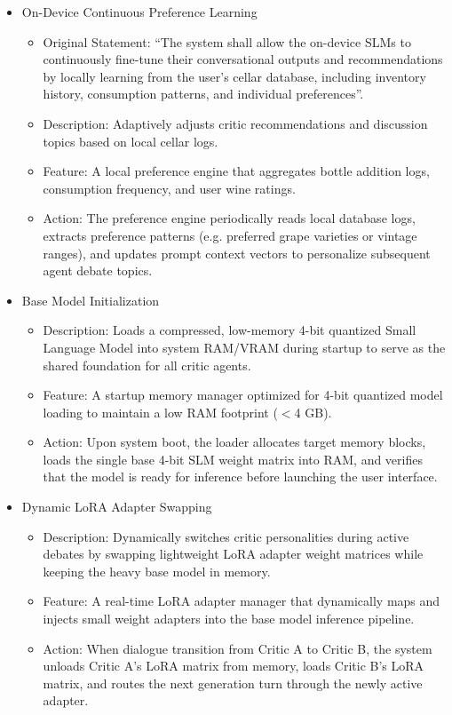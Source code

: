 \documentclass[conference]{IEEEtran}
\begin{document}
\begin{itemize}
    \item On-Device Continuous Preference Learning
    \begin{itemize}
        \item Original Statement: ``The system shall allow the on-device SLMs to continuously fine-tune their conversational outputs and recommendations by locally learning from the user's cellar database, including inventory history, consumption patterns, and individual preferences''.
        \item Description: Adaptively adjusts critic recommendations and discussion topics based on local cellar logs.
        \item Feature: A local preference engine that aggregates bottle addition logs, consumption frequency, and user wine ratings.
        \item Action: The preference engine periodically reads local database logs, extracts preference patterns (e.g. preferred grape varieties or vintage ranges), and updates prompt context vectors to personalize subsequent agent debate topics.
    \end{itemize}

    \item Base Model Initialization
    \begin{itemize}
        \item Description: Loads a compressed, low-memory 4-bit quantized Small Language Model into system RAM/VRAM during startup to serve as the shared foundation for all critic agents.
        \item Feature: A startup memory manager optimized for 4-bit quantized model loading to maintain a low RAM footprint ($<$4 GB).
        \item Action: Upon system boot, the loader allocates target memory blocks, loads the single base 4-bit SLM weight matrix into RAM, and verifies that the model is ready for inference before launching the user interface.
    \end{itemize}

    \item Dynamic LoRA Adapter Swapping
    \begin{itemize}
        \item Description: Dynamically switches critic personalities during active debates by swapping lightweight LoRA adapter weight matrices while keeping the heavy base model in memory.
        \item Feature: A real-time LoRA adapter manager that dynamically maps and injects small weight adapters into the base model inference pipeline.
        \item Action: When dialogue transition from Critic A to Critic B, the system unloads Critic A's LoRA matrix from memory, loads Critic B's LoRA matrix, and routes the next generation turn through the newly active adapter.
    \end{itemize}


\end{itemize}
\end{document}
